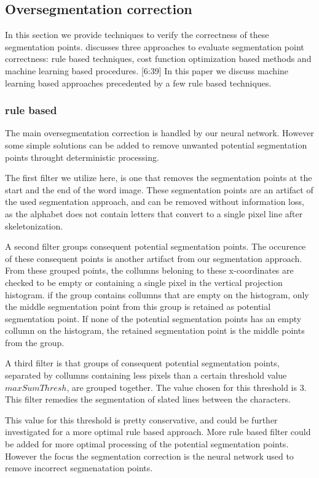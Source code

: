 \documentclass{article}
\begin{document}
\subsection{Oversegmentation correction}
In this section we provide techniques to verify the correctness of these segmentation points. 
\cite{evalsplitpoints} discusses three approaches to evaluate segmentation point correctness: rule based techniques, cost function optimization based methods and machine learning based procedures. [6:39]
In this paper we discuss machine learning based approaches precedented by a few rule based techniques.

\subsubsection{rule based}
The main oversegmentation correction is handled by our neural network.
However some simple solutions can be added to remove unwanted potential segmentation points throught deterministic processing.

The first filter we utilize here, is one that removes the segmentation points at the start and the end of the word image.
These segmentation points are an artifact of the used segmentation approach, and can be removed without information loss, as the alphabet does not contain letters that convert to a single pixel line after skeletonization.

A second filter groups consequent potential segmentation points.
The occurence of these consequent points is another artifact from our segmentation approach.
From these grouped points, the collumns beloning to these x-coordinates are checked to be empty or containing a single pixel in the vertical projection histogram.
if the group contains collumns that are empty on the histogram, only the middle segmentation point from this group is retained as potential segmentation point.
If none of the potential segmentation points has an empty collumn on the histogram, the retained segmentation point is the middle points from the group.

A third filter is that groups of consequent potential segmentation points, separated by collumns containing less pixels than a certain threshold value $maxSumThresh$, are grouped together.
The value chosen for this threshold is 3.
This filter remedies the segmentation of slated lines between the characters.

This value for this threshold is pretty conservative, and could be further investigated for a more optimal rule based approach.
More rule based filter could be added for more optimal processing of the potential segmentation points.
However the focus the segmentation correction is the neural network used to remove incorrect segmenatation points.
\end{document}
